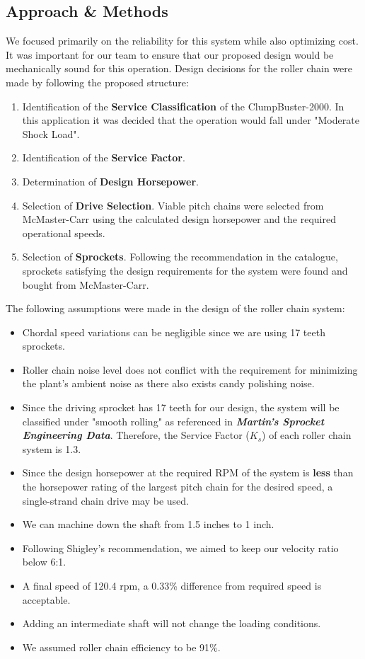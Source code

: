 \documentclass[letterpaper,12pt]{article}
\begin{document}
\subsection{Approach \& Methods}
We focused primarily on the reliability for this system while also optimizing cost. It was important for our team to ensure that our proposed design would be mechanically sound for this operation. Design decisions for the roller chain were made by following the proposed structure:
\begin{enumerate}
    \itemsep0em
    \item Identification of the \textbf{Service Classification} of the ClumpBuster-2000. In this application it was decided that the operation would fall under "Moderate Shock Load".
    \item Identification of the \textbf{Service Factor}.
    \item Determination of \textbf{Design Horsepower}.
    \item Selection of \textbf{Drive Selection}. Viable pitch chains were selected from McMaster-Carr using the calculated design horsepower and the required operational speeds.
    \item Selection of \textbf{Sprockets}. Following the recommendation in the catalogue, sprockets satisfying the design requirements for the system were found and bought from McMaster-Carr.
\end{enumerate}

\noindent The following assumptions were made in the design of the roller chain system:
\begin{itemize}
    \itemsep0em
    \item Chordal speed variations can be negligible since we are using 17 teeth sprockets.
    \item Roller chain noise level does not conflict with the requirement for minimizing the plant's ambient noise as there also exists candy polishing noise.
    \item Since the driving sprocket has 17 teeth for our design, the system will be classified under "smooth rolling" as referenced in \textbf{\textit{Martin's Sprocket Engineering Data}}. Therefore, the Service Factor ($K_s$) of each roller chain system is 1.3.
    \item Since the design horsepower at the required RPM of the system is \textbf{less} than the horsepower rating of the largest pitch chain for the desired speed, a single-strand chain drive may be used.
    \item We can machine down the shaft from 1.5 inches to 1 inch.
    \item Following Shigley's recommendation, we aimed to keep our velocity ratio below 6:1.
    \item A final speed of 120.4 rpm, a 0.33\% difference from required speed is acceptable.
    \item Adding an intermediate shaft will not change the loading conditions.
    \item We assumed roller chain efficiency to be 91\%.
\end{itemize}
\end{document}
